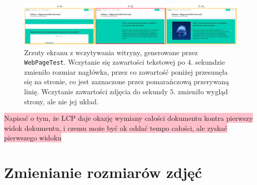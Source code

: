 \documentclass[licencjacka]{pracadypl}
\newcommand{\selfnote}[1]{\colorbox{pink}{#1}}
\begin{document}
\begin{figure}[H]
  \includegraphics[width=\linewidth]{images/filmstrip.png}
  \caption{Zrzuty ekranu z wczytywania witryny, generowane przez \texttt{WebPageTest}. Wczytanie się zawartości tekstowej po $4.$ sekundzie zmieniło rozmiar nagłówka, przez co zawartość poniżej przesunęła się na stronie, co jest zaznaczone przez pomarańczową przerywaną linię. Wczytanie zawartości zdjęcia do sekundy $5.$ zmieniło wygląd strony, ale nie jej układ.}
  \label{fig:loading-layout-and-lcp}
\end{figure}

\selfnote{Napisać o tym, że LCP daje okazję wymiany całości dokumentu kontra pierwszy widok dokumentu, i czemu może być ok oddać tempo całości, ale zyskać pierwszego widoku} 



\section{Zmienianie rozmiarów zdjęć}
\end{document}
